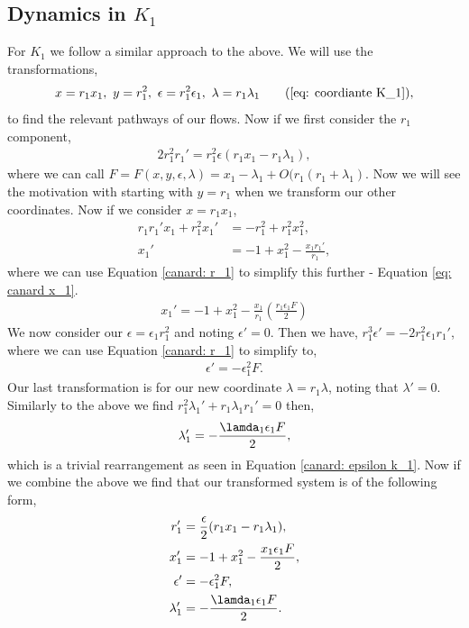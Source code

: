 \documentclass{article}
\begin{document}
\subsection{Dynamics in $K_1$}
For $K_1$ we follow a similar approach to the above. We will use the transformations, 
\begin{equation}
         x=r_1x_1, \ y=r_1^2, \ \epsilon=r_1^2\epsilon_1, \ \lambda=r_1\lambda_1 \tag{\ref{eq: coordiante K_1}},
\end{equation}
to find the relevant pathways of our flows. Now if we first consider the $r_1$ component, 
\begin{align}
    2r_1^2r_1'=r_1^2\epsilon(r_1x_1-r_1\lambda_1), \label{canard: r_1}
\end{align}
where we can call $F=F(x,y,\epsilon,\lambda)=x_1-\lambda_1+O(r_1(r_1+\lambda_1)$. Now we will see the motivation with starting with $y=r_1$ when we transform our other coordinates. Now if we consider $x=r_1x_1$,
\begin{align*}
    r_1r_1'x_1+r_1^2x_1'&=-r_1^2+r_1^2x_1^2,\\
    x_1'&=-1+x_1^2-\frac{x_1r_1'}{r_1},
\end{align*}
where we can use Equation \ref{canard: r_1} to simplify this further - Equation \ref{eq: canard x_1}.
\begin{align}
    x_1'=-1+x_1^2-\frac{x_1}{r_1}\left(\frac{r_1\epsilon_1F}{2}\right) \label{eq: canard x_1}
\end{align}
We now consider our $\epsilon=\epsilon_1r_1^2$ and noting $\epsilon'=0$. Then we have, $r_1^3\epsilon'=-2r_1^2\epsilon_1r_1'$, where we can use Equation \ref{canard: r_1} to simplify to,
\begin{align}
    \epsilon'=-\epsilon_1^2F. \label{canard: epsilon k_1}
\end{align}
Our last transformation is for our new coordinate $\lambda=r_1\lambda$, noting that $\lambda'=0$. Similarly to the above we find $r_1^2\lambda_1'+r_1\lambda_1r_1'=0$ then, 
\begin{equation}
    \lambda'_1=-\frac{\lamda_1\epsilon_1F}{2}, 
\end{equation}
which is a trivial rearrangement as seen in Equation \ref{canard: epsilon k_1}. Now if we combine the above we find that our transformed system is of the following form,
\begin{subequations}
    \begin{align}
            r_1'&=\frac{\epsilon}{2}(r_1x_1-r_1\lambda_1), \\
            x_1'&=-1+x_1^2-\frac{x_1\epsilon_1F}{2},\\
            \epsilon'&=-\epsilon_1^2F,\\
            \lambda'_1&=-\frac{\lamda_1\epsilon_1F}{2}.
    \end{align}
    \label{canard: system of equations}
\end{subequations}
\end{document}
